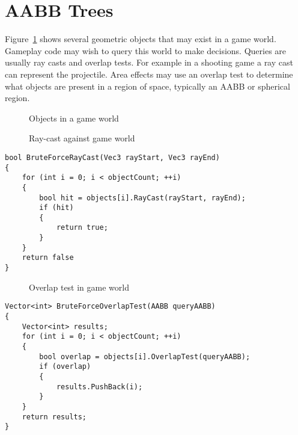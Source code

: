 \documentclass{article}
\begin{document}
\section{AABB Trees}
Figure~\ref{fig:loose} shows several geometric objects that may exist in a game world. Gameplay code may wish to query this world to make decisions. Queries are usually ray casts and overlap tests. For example in a shooting game a ray cast can represent the projectile. Area effects may use an overlap test to determine what objects are present in a region of space, typically an AABB or spherical region.

\begin{figure}
	\begin{center}
		
	\end{center}
	\caption{Objects in a game world}
	\label{fig:loose}
\end{figure}

\begin{figure}
	\begin{center}
		
	\end{center}
	\caption{Ray-cast against game world}
	\label{fig:raycast}
\end{figure}

\begin{lstlisting}[caption={Brute-force ray-casting}, label={lst:brute_ray}, float]
bool BruteForceRayCast(Vec3 rayStart, Vec3 rayEnd)
{
	for (int i = 0; i < objectCount; ++i)
	{
		bool hit = objects[i].RayCast(rayStart, rayEnd);
		if (hit)
		{
			return true;
		}
	}
	return false
}
\end{lstlisting}

\begin{figure}
	\begin{center}
		
	\end{center}
	\caption{Overlap test in game world}
	\label{fig:overlap}
\end{figure}

\begin{lstlisting}[caption={Brute-force overlap test}, label={lst:brute_overlap}, float]
Vector<int> BruteForceOverlapTest(AABB queryAABB)
{
	Vector<int> results;
	for (int i = 0; i < objectCount; ++i)
	{
		bool overlap = objects[i].OverlapTest(queryAABB);
		if (overlap)
		{
			results.PushBack(i);
		}
	}
	return results;
}
\end{lstlisting}
\end{document}
